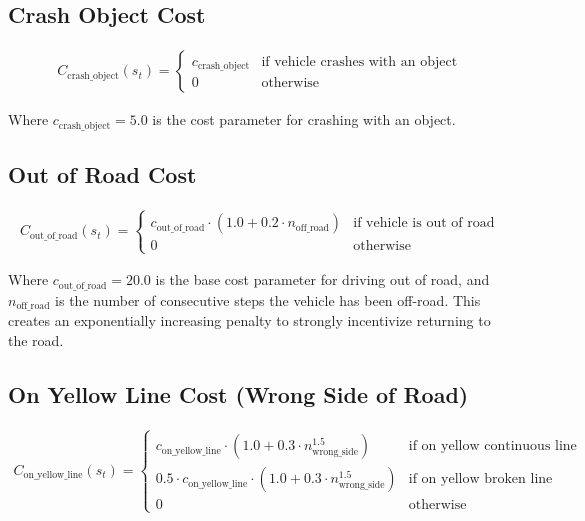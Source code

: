 \documentclass{article}
\begin{document}
\subsection{Crash Object Cost}

\begin{align}
C_{\text{crash\_object}}(s_t) = 
\begin{cases}
c_{\text{crash\_object}} & \text{if vehicle crashes with an object} \\
0 & \text{otherwise}
\end{cases}
\end{align}

Where $c_{\text{crash\_object}} = 5.0$ is the cost parameter for crashing with an object.

\subsection{Out of Road Cost}

\begin{align}
C_{\text{out\_of\_road}}(s_t) = 
\begin{cases}
c_{\text{out\_of\_road}} \cdot (1.0 + 0.2 \cdot n_{\text{off\_road}}) & \text{if vehicle is out of road} \\
0 & \text{otherwise}
\end{cases}
\end{align}

Where $c_{\text{out\_of\_road}} = 20.0$ is the base cost parameter for driving out of road, and $n_{\text{off\_road}}$ is the number of consecutive steps the vehicle has been off-road. This creates an exponentially increasing penalty to strongly incentivize returning to the road.

\subsection{On Yellow Line Cost (Wrong Side of Road)}

\begin{align}
C_{\text{on\_yellow\_line}}(s_t) = 
\begin{cases}
c_{\text{on\_yellow\_line}} \cdot (1.0 + 0.3 \cdot n_{\text{wrong\_side}}^{1.5}) & \text{if on yellow continuous line} \\
0.5 \cdot c_{\text{on\_yellow\_line}} \cdot (1.0 + 0.3 \cdot n_{\text{wrong\_side}}^{1.5}) & \text{if on yellow broken line} \\
0 & \text{otherwise}
\end{cases}
\end{align}
\end{document}
